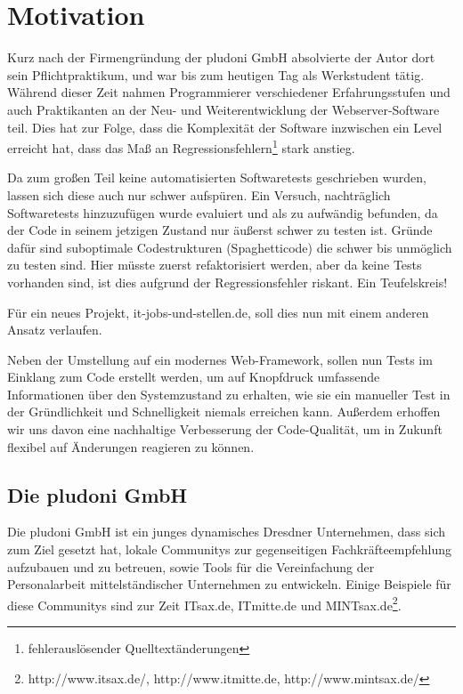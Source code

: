 \section{Motivation}

Kurz nach der Firmengründung der pludoni GmbH absolvierte der Autor dort sein Pflichtpraktikum, und war bis zum heutigen Tag als Werkstudent tätig.
Während dieser Zeit nahmen Programmierer verschiedener Erfahrungsstufen und auch Praktikanten an der Neu- und Weiterentwicklung der Webserver-Software teil. Dies hat zur Folge, dass die Komplexität der Software inzwischen ein Level erreicht hat, dass das Maß an Regressionsfehlern\footnote{fehlerauslösender Quelltextänderungen} stark anstieg. 

Da zum großen Teil keine automatisierten Softwaretests geschrieben wurden, lassen sich diese auch nur schwer aufspüren. Ein Versuch, nachträglich Softwaretests hinzuzufügen wurde evaluiert und als zu aufwändig befunden, da der Code in seinem jetzigen Zustand nur äußerst schwer zu testen ist. Gründe dafür sind suboptimale Codestrukturen (Spaghetticode) die schwer bis unmöglich zu testen sind. Hier müsste zuerst refaktorisiert werden, aber da keine Tests vorhanden sind, ist dies aufgrund der Regressionsfehler riskant. Ein Teufelskreis!

Für ein neues Projekt, it-jobs-und-stellen.de, soll dies nun mit einem anderen Ansatz verlaufen. 

Neben der Umstellung auf ein modernes Web-Framework, sollen nun Tests im Einklang zum Code erstellt werden, um auf Knopfdruck  umfassende Informationen über den Systemzustand zu erhalten, wie sie ein manueller Test in der Gründlichkeit und Schnelligkeit niemals erreichen kann. Außerdem erhoffen wir uns davon eine nachhaltige Verbesserung der Code-Qualität, um in Zukunft flexibel auf Änderungen reagieren zu können.


\subsection{Die pludoni GmbH}

Die pludoni GmbH ist ein junges dynamisches Dresdner Unternehmen, dass sich zum Ziel gesetzt hat, lokale Communitys zur gegenseitigen Fachkräfteempfehlung aufzubauen und zu betreuen, sowie Tools für die Vereinfachung der Personalarbeit mittelständischer Unternehmen zu entwickeln. Einige Beispiele für diese Communitys sind zur Zeit ITsax.de, ITmitte.de und MINTsax.de\footnote{http://www.itsax.de/, http://www.itmitte.de, http://www.mintsax.de/}.
